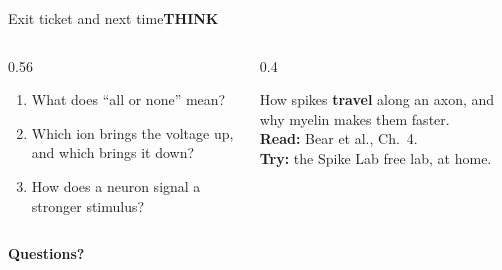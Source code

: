 \documentclass[aspectratio=169,11pt]{beamer}
\newcommand{\tagpill}[3]{{\normalfont\footnotesize\setlength{\fboxsep}{2.5pt}\colorbox{#1}{\textcolor{#2}{\bfseries #3}}}}
\newcommand{\tThink}{\tagpill{white}{kaccent}{THINK}}
\begin{document}
\begin{frame}{Exit ticket and next time}{\tThink}
  \begin{columns}[T]
    \begin{column}{0.56\textwidth}
      \begin{askbox}[title={\bfseries Exit ticket: 3 minutes, booklet page 1}]
        \begin{enumerate}\setlength{\itemsep}{3pt}
          \item What does ``all or none'' mean?
          \item Which ion brings the voltage up, and which brings it down?
          \item How does a neuron signal a stronger stimulus?
        \end{enumerate}
      \end{askbox}
    \end{column}
    \begin{column}{0.4\textwidth}
      \begin{factbox}[title={Next session}]
        How spikes \textbf{travel} along an axon, and why myelin makes them faster.\\[4pt]
        \textbf{Read:} Bear et al., Ch.~4.\\[4pt]
        \textbf{Try:} the Spike Lab free lab, at home.
      \end{factbox}
    \end{column}
  \end{columns}
  \vspace{0.6em}
  \centering\large\color{kprimary}\textbf{Questions?}
\end{frame}
\end{document}
